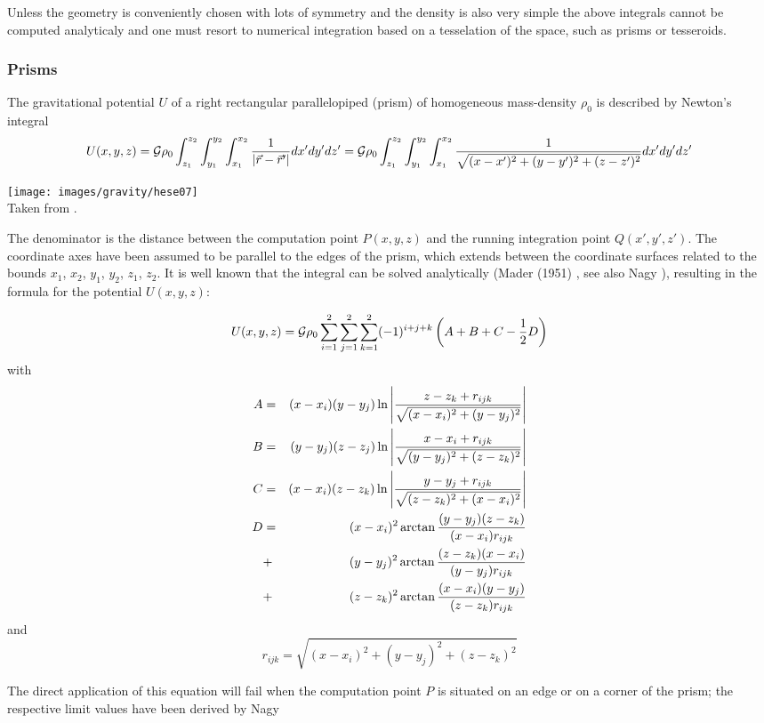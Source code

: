 
Unless the geometry is conveniently chosen with lots of symmetry and the density is also very simple the above 
integrals cannot be computed analyticaly and one must resort to numerical integration based on a tesselation of the 
space, such as prisms or tesseroids. 

\subsubsection{Prisms}


The gravitational potential $U$ of a right rectangular parallelopiped (prism) of homogeneous mass-density $\rho_0$ is
described by Newton's integral \cite{hese07}
\[
U(x,y,z) 
= {\cal G} \rho_0 \int_{z_1}^{z_2}\int_{y_1}^{y_2}\int_{x_1}^{x_2} \frac{1}{|\vec r-\vec r'|}dx'dy'dz'
= {\cal G} \rho_0 \int_{z_1}^{z_2}\int_{y_1}^{y_2}\int_{x_1}^{x_2} \frac{1}{\sqrt{(x-x')^2+(y-y')^2+(z-z')^2} }dx'dy'dz'
\]

\begin{center}
\texttt{[image: images/gravity/hese07]}\\
{\captionfont Taken from \cite{hese07}.}
\end{center}

The denominator is the distance between the computation point $P(x,y,z)$ 
and the running integration point $Q(x',y',z')$. 
The coordinate axes have been assumed to be parallel to the edges of the prism, which
extends between the coordinate surfaces related to the
bounds $x_1$, $x_2$, $y_1$, $y_2$, $z_1$, $z_2$.
It is well known that the integral can be solved analytically (Mader (1951) \cite{made51}, 
see also Nagy \etal \cite{napb00,napb02}), 
resulting in the formula for the potential $U(x,y,z)$:

\[
U(x,y,z)= {\cal G} \rho_0
\sum_{i=1}^2\sum_{j=1}^2\sum_{k=1}^2 (-1)^{i+j+k}
\left(A+B+C-\frac{1}{2}D\right)
\]
with 
\begin{eqnarray}
A&=& (x-x_i)(y-y_j) \ln \left|  \frac{z-z_k + r_{ijk}}{\sqrt{(x-x_i)^2+(y-y_j)^2}}   \right| \nonumber\\
B&=& (y-y_j)(z-z_j) \ln \left|  \frac{x-x_i + r_{ijk}}{\sqrt{(y-y_j)^2+(z-z_k)^2}}   \right| \nonumber\\
C&=& (x-x_i)(z-z_k) \ln \left|  \frac{y-y_j + r_{ijk}}{\sqrt{(z-z_k)^2+(x-x_i)^2}}   \right| \nonumber\\
D&=& (x-x_i)^2 \arctan \frac{(y-y_j) (z-z_k)}{(x-x_i) r_{ijk}} \nonumber\\
 &+& (y-y_j)^2 \arctan \frac{(z-z_k) (x-x_i)}{(y-y_j) r_{ijk}} \nonumber\\
 &+& (z-z_k)^2 \arctan \frac{(x-x_i) (y-y_j)}{(z-z_k) r_{ijk}} \nonumber 
\end{eqnarray}
and 
\[
r_{ijk}=\sqrt{ (x-x_i)^2+(y-y_j)^2+(z-z_k)^2}
\]
\begin{remark}
The direct application of this equation will fail when the computation point $P$ is situated on an edge or on
a corner of the prism; the respective limit values have been derived by Nagy \etal \cite{napb00,napb02}
\end{remark}


